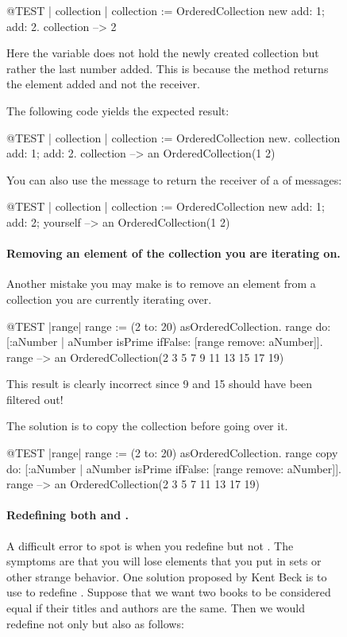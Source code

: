 \documentclass[a4paper,10pt,twoside]{book}
\begin{document}
\begin{figure}
\begin{center}
\begin{code}{@TEST | collection | }
collection := OrderedCollection new add: 1; add: 2.
collection --> 2
\end{code}
\noindent
Here the variable  does not hold the newly created collection but rather the last number added. 
This is because the method  returns the element added and not the receiver.

The following code yields the expected result:
\begin{code}{@TEST | collection |}
collection := OrderedCollection new.
collection add: 1; add: 2.
collection --> an OrderedCollection(1 2)
\end{code}

You can also use the message  to return the receiver of a  of messages:

\begin{code}{@TEST | collection |}
collection := OrderedCollection new add: 1; add: 2; yourself --> an OrderedCollection(1 2)
\end{code}

\paragraph{Removing an element of the collection you are iterating on.}
Another mistake you may make is to remove an element from a collection you are currently iterating over.
\begin{code}{@TEST |range|}
range := (2 to: 20) asOrderedCollection.
range do: [:aNumber | aNumber isPrime ifFalse: [range remove: aNumber]].
range --> an OrderedCollection(2 3 5 7 9 11 13 15 17 19)
\end{code}
\noindent
This result is clearly incorrect since 9 and 15 should have been filtered out!

The solution is to copy the collection before going over it.
\begin{code}{@TEST |range|}
range := (2 to: 20) asOrderedCollection.
range copy do: [:aNumber | aNumber isPrime ifFalse: [range remove: aNumber]].
range --> an OrderedCollection(2 3 5 7 11 13 17 19)
\end{code}

\paragraph{Redefining both \ct{=} and .}
A difficult error to spot is when you redefine \ct{=} but not .
The symptoms are that you will lose elements that you put in sets or other strange behavior. 
One solution proposed by Kent Beck is to use  to redefine .
Suppose that we want two books to be considered equal if their titles and authors are the same.
Then we would redefine not only \ct{=} but also  as follows:


\end{center}
\end{figure}
\end{document}
